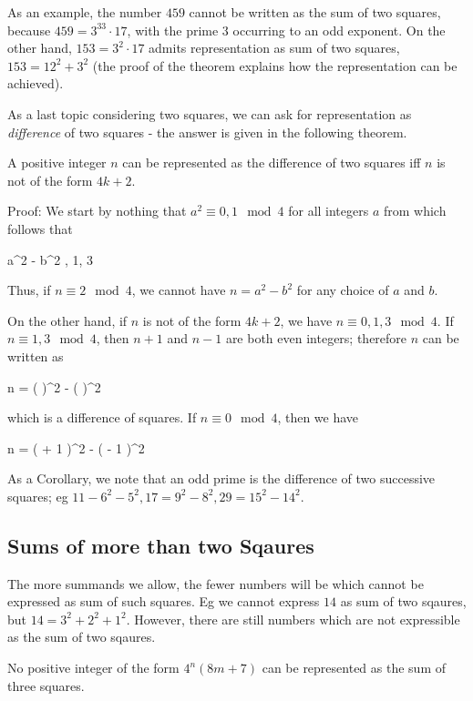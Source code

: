 As an example, the number $459$ cannot be written as the sum of two squares, because $459 = 3^33 \cdot 17$, with the prime $3$ occurring to an odd exponent. On the other hand, $153 = 3^2 \cdot 17$ admits representation as sum of two squares, $153 = 12^2 + 3^2$ (the proof of the theorem explains how the representation can be achieved).

As a last topic considering two squares, we can ask for representation as \emph{difference} of two squares - the answer is given in the following theorem.

\begin{theorem}
A positive integer $n$ can be represented as the difference of two squares iff $n$ is not of the form $4k+2$.
\end{theorem}

Proof: We start by nothing that $a^2 \equiv 0, 1 \mod 4$ for all integers $a$ from which follows that

\bee
a^2 - b^2 , 1, 3 
\eee

Thus, if $n \equiv 2 \mod 4$, we cannot have $n = a^2 - b^2$ for any choice of $a$ and $b$.

On the other hand, if $n$ is not of the form $4k+2$, we have $n \equiv 0, 1, 3 \mod 4$. If $n \equiv 1, 3 \mod 4$, then $n+1$ and $n-1$ are both even integers; therefore $n$ can be written as

\bee
n = \left(  \right)^2 - \left(  \right)^2
\eee

which is a difference of squares. If $n \equiv 0 \mod 4$, then we have

\bee
n = \left(  + 1 \right)^2 - \left(  - 1 \right)^2
\eee

As a Corollary, we note that an odd prime is the difference of two successive squares; eg $11 - 6^2 - 5^2, 17 = 9^2 - 8^2, 29 = 15^2 - 14^2$.


\subsection{Sums of more than two Sqaures}

The more summands we allow, the fewer numbers will be which cannot be expressed as sum of such squares. Eg we cannot express $14$ as sum of two sqaures, but $14 = 3^2 + 2^2 + 1^2$. However, there are still numbers which are not expressible as the sum of two sqaures.

\begin{theorem}
	No positive integer of the form $4^n (8m + 7)$ can be represented as the sum of three squares.
\end{theorem}


